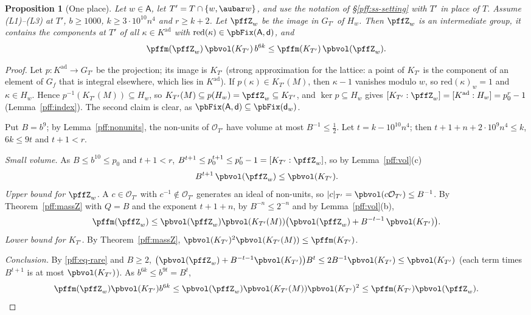 \documentclass[10pt]{amsart}
\newtheorem{proposition}[theorem]{Proposition}
\theoremstyle{definition}
\theoremstyle{remark}
\providecommand{\auO}{\mathcal O}
\begin{document}
\begin{proposition}[One place]\label{pff:oneplace}
Let $w\in\mathsf A$, let $T'=T\cap\{w,\aubar w\}$, and use the notation of \S\ref{pff:ss-setting}
with $T'$ in place of $T$. Assume (L1)--(L3) at $T'$, $b\ge1000$, $k\ge3\cdot10^{10}n^4$ and $r\ge
k+2$. Let $\pffZ_w$ be the image in $G_{T'}$ of $H_w$. Then $\pffZ_w$ is an intermediate group, it
contains the components at $T'$ of all $\kappa\in K^{\mathrm{ad}}$ with $\mathrm{red}(\kappa)\in
\pbFix(\mathsf A,\mathsf d)$, and
\[
\pffm(\pffZ_w)\,\pbvol(K_{T'})\,b^{6k}\le\pffm(K_{T'})\,\pbvol(\pffZ_w).
\]
\end{proposition}
\begin{proof}
Let $p\colon K^{\mathrm{ad}}\to G_{T'}$ be the projection; its image is $K_{T'}$ (strong
approximation for the lattice: a point of $K_{T'}$ is the component of an element of $G_f$ that is
integral elsewhere, which lies in $K^{\mathrm{ad}}$). If $p(\kappa)\in K_{T'}(M)$, then $\kappa-1$
vanishes modulo $w$, so $\mathrm{red}(\kappa)_w=1$ and $\kappa\in H_w$. Hence $p^{-1}(K_{T'}(M))
\subseteq H_w$, so $K_{T'}(M)\subseteq p(H_w)=\pffZ_w\subseteq K_{T'}$, and $\ker p\subseteq H_w$
gives $[K_{T'}:\pffZ_w]=[K^{\mathrm{ad}}:H_w]=p_0^r-1$ (Lemma~\ref{pff:index}). The second claim
is clear, as $\pbFix(\mathsf A,\mathsf d)\subseteq\pbFix(\mathsf d_w)$.

Put $B=b^9$; by Lemma~\ref{pff:nonunits}, the non-units of $\auO_{T'}$ have volume at most
$B^{-1}\le\frac12$. Let $t=k-10^{10}n^4$; then $t+1+n+2\cdot10^9n^4\le k$, $6k\le9t$ and $t+1<r$.

\emph{Small volume.} As $B\le b^{10}\le p_0$ and $t+1<r$, $B^{t+1}\le p_0^{t+1}\le p_0^r-1=
[K_{T'}:\pffZ_w]$, so by Lemma~\ref{pff:vol}(c)
\begin{equation}\label{pff:eq-rare}
B^{t+1}\,\pbvol(\pffZ_w)\le\pbvol(K_{T'}).
\end{equation}
\emph{Upper bound for $\pffZ_w$.} A $c\in\auO_{T'}$ with $c^{-1}\notin\auO_{T'}$ generates an ideal
of non-units, so $|c|_{T'}=\pbvol(c\auO_{T'})\le B^{-1}$. By Theorem~\ref{pff:massZ} with $Q=B$
and the exponent $t+1+n$, by $B^{-n}\le2^{-n}$ and by Lemma~\ref{pff:vol}(b),
\[
\pffm(\pffZ_w)\le\pbvol(\pffZ_w)\pbvol(K_{T'}(M))\bigl(\pbvol(\pffZ_w)+B^{-t-1}\,\pbvol(K_{T'})\bigr).
\]
\emph{Lower bound for $K_{T'}$.} By Theorem~\ref{pff:massZ}, $\pbvol(K_{T'})^2\pbvol(K_{T'}(M))\le
\pffm(K_{T'})$.

\emph{Conclusion.} By \eqref{pff:eq-rare} and $B\ge2$, $\bigl(\pbvol(\pffZ_w)+B^{-t-1}\pbvol(K_{T'})
\bigr)B^t\le2B^{-1}\pbvol(K_{T'})\le\pbvol(K_{T'})$ (each term times $B^{t+1}$ is at most
$\pbvol(K_{T'})$). As $b^{6k}\le b^{9t}=B^t$,
\[
\pffm(\pffZ_w)\pbvol(K_{T'})b^{6k}\le\pbvol(\pffZ_w)\pbvol(K_{T'}(M))\pbvol(K_{T'})^2\le\pffm(K_{T'})
\pbvol(\pffZ_w).\qedhere
\]
\end{proof}
\end{document}
